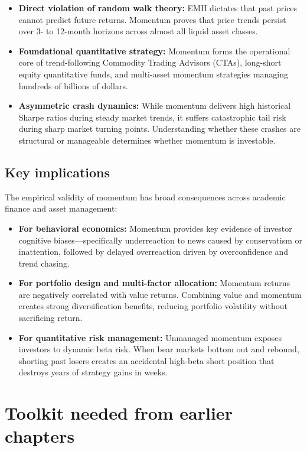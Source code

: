 \begin{itemize}
  \item \textbf{Direct violation of random walk theory:} EMH dictates that past prices cannot predict future returns. Momentum proves that price trends persist over 3- to 12-month horizons across almost all liquid asset classes.
  \item \textbf{Foundational quantitative strategy:} Momentum forms the operational core of trend-following Commodity Trading Advisors (CTAs), long-short equity quantitative funds, and multi-asset momentum strategies managing hundreds of billions of dollars.
  \item \textbf{Asymmetric crash dynamics:} While momentum delivers high historical Sharpe ratios during steady market trends, it suffers catastrophic tail risk during sharp market turning points. Understanding whether these crashes are structural or manageable determines whether momentum is investable.
\end{itemize}

\subsection{Key implications}

The empirical validity of momentum has broad consequences across academic finance and asset management:

\begin{itemize}
  \item \textbf{For behavioral economics:} Momentum provides key evidence of investor cognitive biases—specifically underreaction to news caused by conservatism or inattention, followed by delayed overreaction driven by overconfidence and trend chasing.
  \item \textbf{For portfolio design and multi-factor allocation:} Momentum returns are negatively correlated with value returns. Combining value and momentum creates strong diversification benefits, reducing portfolio volatility without sacrificing return.
  \item \textbf{For quantitative risk management:} Unmanaged momentum exposes investors to dynamic beta risk. When bear markets bottom out and rebound, shorting past losers creates an accidental high-beta short position that destroys years of strategy gains in weeks.
\end{itemize}

\section{Toolkit needed from earlier chapters}
\label{sec:09-connection}

